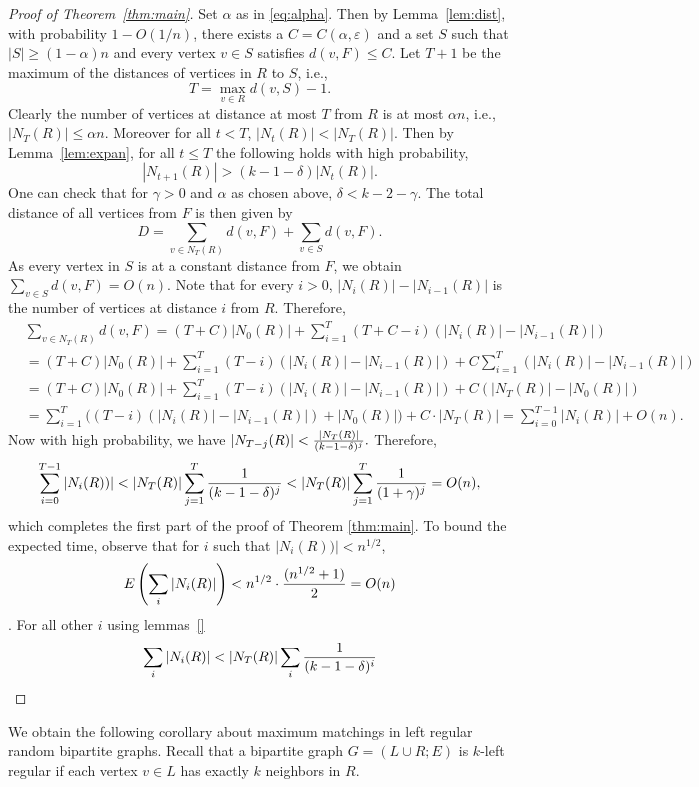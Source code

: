 \begin{proof}[Proof of Theorem~\ref{thm:main}]
Set $\alpha$ as in \eqref{eq:alpha}.
Then by Lemma~\ref{lem:dist}, with probability $1-O(1/n)$, there exists a $C=C(\alpha, \varepsilon)$ and a set $S$  such that $|S| \ge (1-\alpha)n$ and every vertex $v\in S$ satisfies $d(v,F)\le C.$
Let $T+1$ be the maximum of the distances of vertices in $R$ to $S$, i.e.,
\[ T = \max_{v \in R} d(v,S) -1 .\]
Clearly the number of vertices at distance at most $T$ from $R$ is at most $\alpha n$, i.e., $|N_T(R)|\le \alpha n$. 
Moreover for all $t<T$, $|N_t(R)| < |N_T(R)|$. 
Then by Lemma~\ref{lem:expan}, for all $t\le T$ the following holds with high probability,
\[ |N_{t+1}(R)| >  \left(k-1- \delta\right)| N_t(R)|.\]
One can check that for $\gamma >0$ and $\alpha$ as chosen above, $ \delta < k-2-\gamma.$
The total distance of all vertices from $F$ is then given by
 \[D=  \sum_{v\in N_{T}(R)} d(v,F) + \sum_{v\in S} d(v,F). \]
 As every vertex in $S$ is at a constant distance from $F$,  we obtain $\sum_{v\in S} d(v,F)=O(n)$.
 Note that for every $i>0$, $ | N_{i}(R)| - | N_{i-1}(R)|$ is the number of vertices at distance $i$ from $R$.
Therefore,
 \begin{align*}
 &\sum_{v\in N_{T}(R)} d(v,F)=  (T+C)|N_{0}(R)| + \sum _{i=1}^{T} (T+C-i)(| N_{i}(R)| - | N_{i-1}(R)|)\\
 &=(T+C)|N_{0}(R)| + \sum _{i=1}^{T} (T-i)(| N_{i}(R)| - | N_{i-1}(R)|) +C \sum _{i=1}^{T}( | N_{i}(R)| - | N_{i-1}(R)|)\\
 &=(T+C)|N_{0}(R)| + \sum _{i=1}^{T} (T-i)(| N_{i}(R)| - | N_{i-1}(R)|) +C ( | N_{T}(R)| - | N_{0}(R)|)\\
 &= \sum _{i=1}^{T} \bigg((T-i)(| N_{i}(R)| - | N_{i-1}(R)|) +|N_0(R)|\bigg)+C \cdot | N_{T}(R)| =\sum _{i=0}^{T-1} |N_i(R)| + O(n).
 \end{align*} 
Now with high probability, we have $|N_{T-j}(R) | <    {| N_{T}(R)| \over (k-1-\delta)^j } .
$ 
Therefore,
\[
\sum _{i=0}^{T-1}| N_i(R)) |< |N_{T}(R)|  \sum_{j=1}^{T}   {1 \over (k-1-\delta)^j }  <  |N_{T}(R)|  \sum_{j=1}^{T}   {1 \over (1+\gamma)^j } =O(n),\]
which completes the first part of the proof of Theorem \ref{thm:main}. 
To bound the expected time, observe that for $i$ such that $|N_i(R))|< n^{1/2}$,
$$E\left(\sum_{i}|N_i(R)|\right) < n^{1/2}\cdot {(n^{1/2} +1) \over 2}= O(n)$$.
 For all other $i$ using lemmas~\ref{}
$$\sum_{i}|N_i(R)| < |N_{T}(R)|  \sum_i {1 \over (k-1-\delta)^i} $$
\end{proof}

We obtain the following corollary about maximum matchings in left regular random bipartite graphs. Recall that a bipartite graph $G=(L\cup R;E)$ is  $k$-left regular if each vertex $v\in L$ has exactly $k$ neighbors in $R$.

